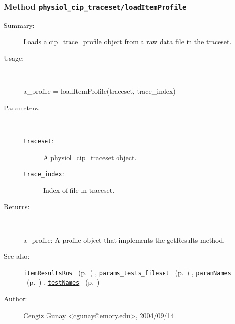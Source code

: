 \subsubsection[Method \texttt{loadItemProfile}]{Method \texttt{physiol\_cip\_traceset/loadItemProfile}}%
%
\label{ref_physiol_cip_traceset__loadItemProfile}%
\hypertarget{ref_physiol_cip_traceset__loadItemProfile}{}%
\begin{description}
\item[Summary:]Loads a cip\_trace\_profile object from a raw data file in the traceset.
%
\item[Usage:]~%
\begin{lyxcode}%
a\_profile = loadItemProfile(traceset, trace\_index)
%
\end{lyxcode}%
%
%
\item[Parameters:]~
\begin{description}%
\item[\texttt{traceset}:]
 A physiol\_cip\_traceset object.
\item[\texttt{trace\_index}:]
 Index of file in traceset.
\end{description}%
%
\item[Returns:
]~

	a\_profile: A profile object that implements the getResults method.
%
%
\item[See also:]%
\hyperlink{ref_itemResultsRow}{\texttt{itemResultsRow}}%
\ (p.~\pageref{ref_itemResultsRow})%
%
, \hyperlink{ref_params_tests_fileset}{\texttt{params\_tests\_fileset}}%
\ (p.~\pageref{ref_params_tests_fileset})%
%
, \hyperlink{ref_paramNames}{\texttt{paramNames}}%
\ (p.~\pageref{ref_paramNames})%
%
, \hyperlink{ref_testNames}{\texttt{testNames}}%
\ (p.~\pageref{ref_testNames})%
%
%
\item[Author:]%
Cengiz Gunay <cgunay@emory.edu>, 2004/09/14
%
\end{description}
\methodline%
